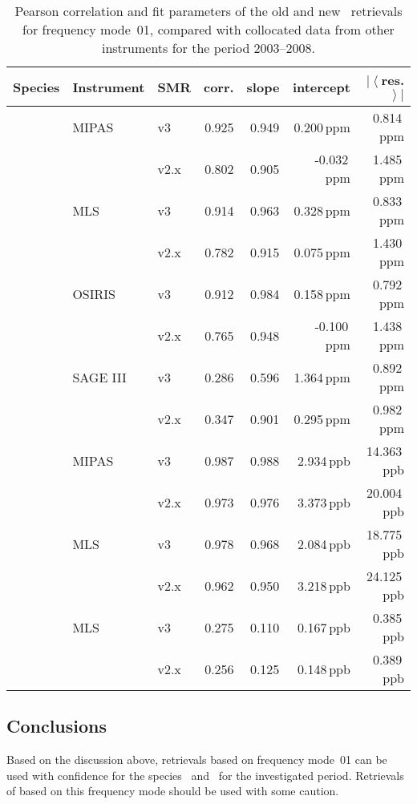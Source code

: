 \begin{table}[hbt]
\centering
\caption{Pearson correlation and fit parameters of the old and new \smr\
retrievals for frequency mode~01, compared with collocated data from other
instruments for the period 2003--2008.
}
\label{tab:fm01:stats}
\begin{tabular}{lllrrrr}
    \toprule
    \textbf{Species} & \textbf{Instrument} & \textbf{SMR} & \textbf{corr.} & \textbf{slope} & \textbf{intercept} & \textbf{$\left|\left<\right.\right.$res.$\left.\left.\right>\right|$} \\
    \midrule
    \chem{O3}   & MIPAS     & v3    & 0.925 & 0.949 & 0.200\,ppm    &  0.814\,ppm \\
                &           & v2.x  & 0.802 & 0.905 & -0.032\,ppm   &  1.485\,ppm \\
    \cline{2-7}
                & MLS       & v3    & 0.914 & 0.963 & 0.328\,ppm    &  0.833\,ppm \\
                &           & v2.x  & 0.782 & 0.915 & 0.075\,ppm    &  1.430\,ppm \\
    \cline{2-7}
                & OSIRIS    & v3    & 0.912 & 0.984 & 0.158\,ppm    &  0.792\,ppm \\
                &           & v2.x  & 0.765 & 0.948 & -0.100\,ppm   &  1.438\,ppm \\
    \cline{2-7}
                & SAGE III  & v3    & 0.286 & 0.596 & 1.364\,ppm    &  0.892\,ppm \\
                &           & v2.x  & 0.347 & 0.901 & 0.295\,ppm    &  0.982\,ppm \\
    \midrule
    \chem{N_2O} & MIPAS     & v3    & 0.987 & 0.988 & 2.934\,ppb    & 14.363\,ppb \\
                &           & v2.x  & 0.973 & 0.976 & 3.373\,ppb    & 20.004\,ppb \\
    \cline{2-7}
                & MLS       & v3    & 0.978 & 0.968 & 2.084\,ppb    & 18.775\,ppb \\
                &           & v2.x  & 0.962 & 0.950 & 3.218\,ppb    & 24.125\,ppb \\
    \midrule
    \chem{ClO}  & MLS       & v3    & 0.275 & 0.110 & 0.167\,ppb    &  0.385\,ppb \\
                &           & v2.x  & 0.256 & 0.125 & 0.148\,ppb    &  0.389\,ppb \\
    \bottomrule
\end{tabular}
\end{table}

\subsection{Conclusions}
\label{sec:fm01:conclusions}
Based on the discussion above, retrievals based on frequency mode~01 can be
used with confidence for the species~\chem{O_3} and~\chem{N_2O} for the
investigated period. Retrievals of \chem{ClO} based on this frequency mode
should be used with some caution.
